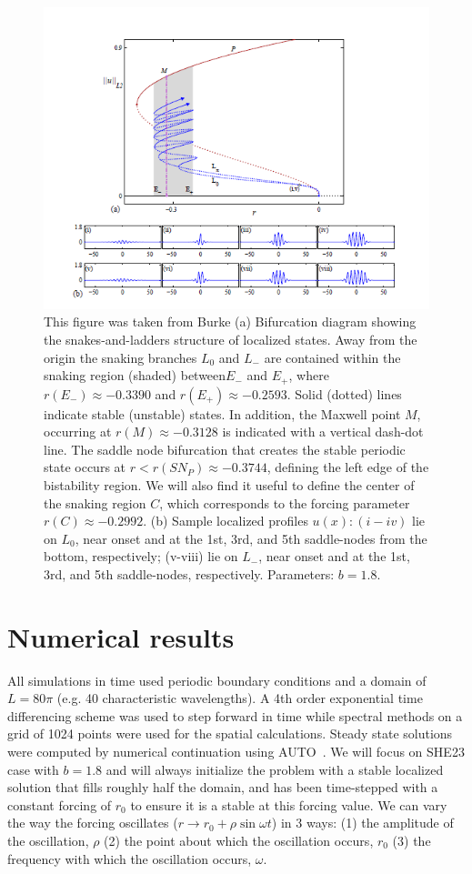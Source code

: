 \documentclass[pre,preprint,superscriptaddress]{revtex4-1}
\begin{document}
\begin{figure}[h!]\center
\includegraphics[width=120mm]{BurkeSHE.PNG}
\caption{\label{fig:BurkeSHE}This figure was taken from Burke\cite{} (a) Bifurcation diagram showing the snakes-and-ladders structure of localized states. Away from the origin the snaking branches $L_0$ and $L_-$ are contained within the snaking region (shaded) between$E_-$ and $E_+$, where $r(E_-)\approx -0.3390$ and $r(E_+)\approx -0.2593$.   Solid (dotted) lines indicate stable (unstable) states. In addition, the Maxwell point $M$, occurring at $r(M)\approx -0.3128$  is indicated with a vertical dash-dot line.  The saddle node bifurcation that creates the stable periodic state occurs at $r<r(SN_P)\approx -0.3744$, defining the left edge of the bistability region.  We will also find it useful to define the center of the snaking region $C$, which corresponds to  the forcing parameter $r(C)\approx -0.2992$. (b) Sample localized profiles $u(x): (i-iv)$ lie on $L_0$, near onset and at the 1st, 3rd, and 5th saddle-nodes from the bottom, respectively; (v-viii) lie on $L_-$, near onset and at the 1st, 3rd, and 5th saddle-nodes, respectively. Parameters: $b = 1.8$.} 
\end{figure}


\section{Numerical results}

All simulations in time used periodic boundary conditions and a domain of $L=80\pi$ (e.g. 40 characteristic wavelengths).  A 4th order exponential time differencing scheme\cite{cox2002} was used to step forward  in time while spectral methods on a grid of 1024 points were used for the spatial calculations.  Steady state solutions were computed by numerical continuation using AUTO~\cite{doedel1981auto}.   We will focus on SHE23 case with $b=1.8$ and will always initialize the problem with a stable localized solution that fills roughly half the domain, and has been time-stepped with a constant forcing of $r_0$ to ensure it is a stable at this forcing value.  We can vary the way the forcing oscillates ($r\rightarrow r_0+\rho \sin\omega t$) in 3 ways: (1) the amplitude of the oscillation, $\rho$ (2) the point about which the oscillation occurs, $r_0$ (3) the frequency with which the oscillation occurs, $\omega$. 
\end{document}

